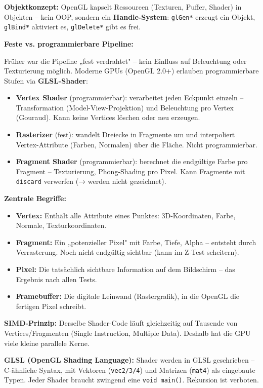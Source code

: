 \documentclass[12pt, a4paper]{article}
\begin{document}
\medskip
\textbf{Objektkonzept:} OpenGL kapselt Ressourcen (Texturen, Puffer, Shader) in Objekten -- kein OOP, sondern ein \textbf{Handle-System}: \texttt{glGen*} erzeugt ein Objekt, \texttt{glBind*} aktiviert es, \texttt{glDelete*} gibt es frei.

\medskip
\textbf{Feste vs. programmierbare Pipeline:}

Früher war die Pipeline „fest verdrahtet" -- kein Einfluss auf Beleuchtung oder Texturierung möglich. Moderne GPUs (OpenGL 2.0+) erlauben programmierbare Stufen via \textbf{GLSL-Shader}:

\begin{itemize}
  \item \textbf{Vertex Shader} (programmierbar): verarbeitet jeden Eckpunkt einzeln -- Transformation (Model-View-Projektion) und Beleuchtung pro Vertex (Gouraud). Kann keine Vertices löschen oder neu erzeugen.
  \item \textbf{Rasterizer} (fest): wandelt Dreiecke in Fragmente um und interpoliert Vertex-Attribute (Farben, Normalen) über die Fläche. Nicht programmierbar.
  \item \textbf{Fragment Shader} (programmierbar): berechnet die endgültige Farbe pro Fragment -- Texturierung, Phong-Shading pro Pixel. Kann Fragmente mit \texttt{discard} verwerfen (→ werden nicht gezeichnet).
\end{itemize}

\textbf{Zentrale Begriffe:}
\begin{itemize}
  \item \textbf{Vertex:} Enthält alle Attribute eines Punktes: 3D-Koordinaten, Farbe, Normale, Texturkoordinaten.
  \item \textbf{Fragment:} Ein „potenzieller Pixel" mit Farbe, Tiefe, Alpha -- entsteht durch Verrasterung. Noch nicht endgültig sichtbar (kann im Z-Test scheitern).
  \item \textbf{Pixel:} Die tatsächlich sichtbare Information auf dem Bildschirm -- das Ergebnis nach allen Tests.
  \item \textbf{Framebuffer:} Die digitale Leinwand (Rastergrafik), in die OpenGL die fertigen Pixel schreibt.
\end{itemize}

\textbf{SIMD-Prinzip:} Derselbe Shader-Code läuft gleichzeitig auf Tausende von Vertices/Fragmenten (Single Instruction, Multiple Data). Deshalb hat die GPU viele kleine parallele Kerne.

\medskip
\textbf{GLSL (OpenGL Shading Language):} Shader werden in GLSL geschrieben -- C-ähnliche Syntax, mit Vektoren (\texttt{vec2/3/4}) und Matrizen (\texttt{mat4}) als eingebaute Typen. Jeder Shader braucht zwingend eine \texttt{void main()}. Rekursion ist verboten.
\end{document}

